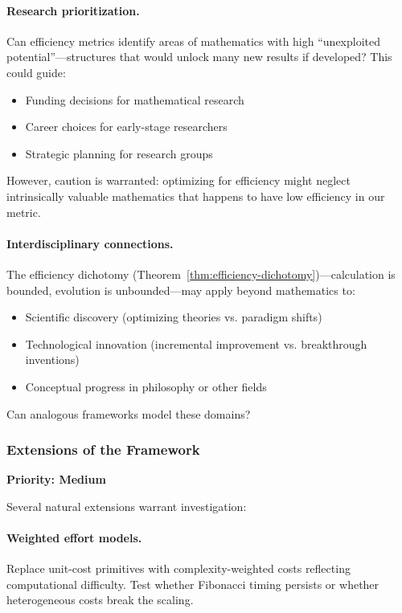 \documentclass[11pt]{article}
\theoremstyle{definition}
\theoremstyle{remark}
\begin{document}
\paragraph{Research prioritization.}
Can efficiency metrics identify areas of mathematics with high ``unexploited potential''---structures
that would unlock many new results if developed? This could guide:
\begin{itemize}
\item Funding decisions for mathematical research
\item Career choices for early-stage researchers
\item Strategic planning for research groups
\end{itemize}

However, caution is warranted: optimizing for efficiency might neglect intrinsically valuable mathematics
that happens to have low efficiency in our metric.

\paragraph{Interdisciplinary connections.}
The efficiency dichotomy (Theorem~\ref{thm:efficiency-dichotomy})---calculation is bounded, evolution
is unbounded---may apply beyond mathematics to:
\begin{itemize}
\item Scientific discovery (optimizing theories vs. paradigm shifts)
\item Technological innovation (incremental improvement vs. breakthrough inventions)
\item Conceptual progress in philosophy or other fields
\end{itemize}

Can analogous frameworks model these domains?

\subsubsection{Extensions of the Framework}

\textbf{Priority: Medium}

Several natural extensions warrant investigation:

\paragraph{Weighted effort models.}
Replace unit-cost primitives with complexity-weighted costs reflecting computational difficulty.
Test whether Fibonacci timing persists or whether heterogeneous costs break the scaling.
\end{document}
